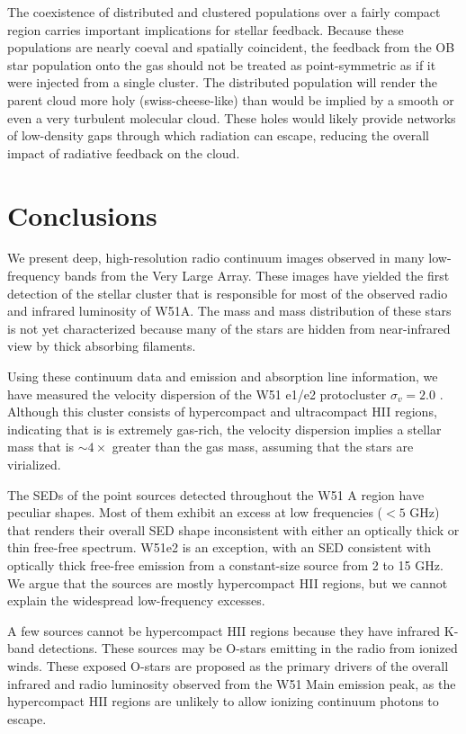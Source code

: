 The coexistence of distributed and clustered populations over a fairly compact
region carries important implications for stellar feedback.  Because these
populations are nearly coeval and spatially coincident, the feedback from the
OB star population onto the gas should not be treated as point-symmetric as if
it were injected from a single cluster.  The distributed population will render
the parent cloud more holy (swiss-cheese-like) than would be implied by a
smooth or even a very turbulent molecular cloud.  These holes would likely
provide networks of low-density gaps through which radiation can escape,
reducing the overall impact of radiative feedback on the cloud.

\section{Conclusions}
We present deep, high-resolution radio continuum images observed in many
low-frequency bands from the Very Large Array.  These images have yielded the
first detection of the stellar cluster that is responsible for most of the
observed radio and infrared luminosity of W51A.  The mass and mass distribution
of these stars is not yet characterized because many of the stars are hidden
from near-infrared view by thick absorbing filaments.

Using these continuum data and \formaldehyde emission and absorption line
information, we have measured the velocity dispersion of the W51 e1/e2
protocluster $\sigma_v=2.0$ \kms.  Although this cluster consists of
hypercompact and ultracompact HII regions, indicating that is is extremely
gas-rich, the velocity dispersion implies a stellar mass that is $\sim4\times$
greater than the gas mass, assuming that the stars are virialized.

The SEDs of the point sources detected throughout the W51 A region have
peculiar shapes.  Most of them exhibit an excess at low frequencies ($<5$ GHz)
that renders their overall SED shape inconsistent with either an optically
thick or thin free-free spectrum.  W51e2 is an exception, with an SED
consistent with optically thick free-free emission from a constant-size source
from 2 to 15 GHz.  We argue that the sources are mostly hypercompact HII
regions, but we cannot explain the widespread low-frequency excesses.

A few sources cannot be hypercompact HII regions because they have infrared
K-band detections.  These sources may be O-stars emitting in the radio from
ionized winds.  These exposed O-stars are proposed as the primary drivers of
the overall infrared and radio luminosity observed from the W51 Main emission
peak, as the hypercompact HII regions are unlikely to allow ionizing continuum
photons to escape.

